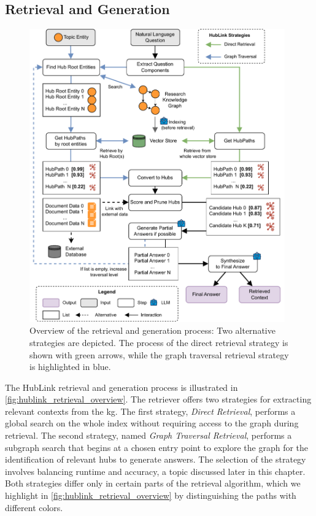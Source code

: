 \subsection{Retrieval and Generation}
\label{sec:hublink_overview_retrieval_generation}

\begin{figure}
    \centering
    \includegraphics[width=0.98\textwidth]{figures/hublink/Hublink_figures-Overview_topic_strat.drawio.pdf}
    \caption[Overview of the Retrieval and Generation Process]{Overview of the retrieval and generation process: Two alternative strategies are depicted. The process of the direct retrieval strategy is shown with green arrows, while the graph traversal retrieval strategy is highlighted in blue.}
    \label{fig:hublink_retrieval_overview}
\end{figure}

The HubLink retrieval and generation process is illustrated in \autoref{fig:hublink_retrieval_overview}. The retriever offers two strategies for extracting relevant contexts from the \gls{kg}. The first strategy, \emph{Direct Retrieval}, performs a global search on the whole index without requiring access to the graph during retrieval. The second strategy, named \emph{Graph Traversal Retrieval}, performs a subgraph search that begins at a chosen entry point to explore the graph for the identification of relevant hubs to generate answers. The selection of the strategy involves balancing runtime and accuracy, a topic discussed later in this chapter. Both strategies differ only in certain parts of the retrieval algorithm, which we highlight in \autoref{fig:hublink_retrieval_overview} by distinguishing the paths with different colors.


